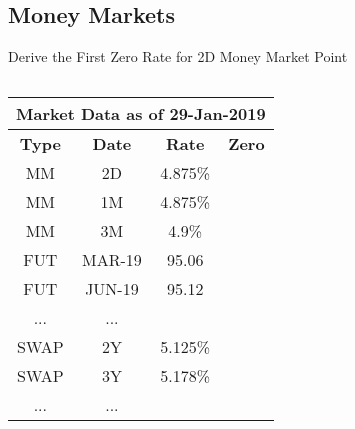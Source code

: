 \documentclass[handout, aspectratio=169]{beamer}
\begin{document}
\subsection{Money Markets}
\begin{frame}{Derive the First Zero Rate for 2D Money Market Point}
  	\begin{columns}[T]
	  \begin{column}{0.4\textwidth}
		  \begin{table}[t]
			  \centering
			  \begin{adjustbox}{max width=\textwidth, max height=\textheight}
				  \begin{tabular}{|c|c|c|c|} 
					  \hline
					  \multicolumn{4}{|c|}{\textbf{Market Data as of 29-Jan-2019}} \\
					  \hline
					  \textbf{Type} & \textbf{Date}  & \textbf{Rate} & \textbf{Zero}\\				
					  \hline
					  MM & 2D & 4.875\% &\\
					  MM & 1M & 4.875\% &\\
					  MM & 3M & 4.9\% &\\
					  \hline
					  FUT & MAR-19 & 95.06 &\\
					  FUT & JUN-19 & 95.12 &\\
					  ... & ... & &\\
					  \hline
					  SWAP & 2Y & 5.125\% &\\
					  SWAP & 3Y & 5.178\% &\\
					  ... & ... & &\\
					  \hline
				  \end{tabular}
			  \end{adjustbox}
		  \end{table}
	  \end{column}
	  

\end{columns}
\end{frame}
\end{document}
